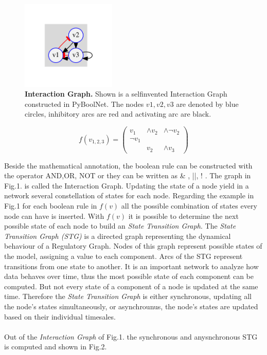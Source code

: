 \begin{figure}[H]
\centering
\includegraphics[width=0.4\textwidth]{./Bilder/example02_igraph}
\caption[Interaction Graph]{\textbf{Interaction Graph.} Shown is a selfinvented Interaction Graph constructed in PyBoolNet. The nodes $v1,v2,v3$ are denoted by blue circles, inhibitory arcs are red and activating arc are black. }
\label{fig:Fig.3.}
\end{figure}

\begin{equation}
f(v_{1,2,3})= \begin{pmatrix}
 v_1      & \wedge v_2 & \wedge \neg v_2\\
 \neg v_1 &           & \\
         & v_2        &\wedge v_3
\end{pmatrix}
\end{equation} 



Beside the mathematical annotation, the boolean rule can be constructed with the operator AND,OR, NOT or they can be written as \& , ||, ! . The graph in Fig.1. is called the Interaction Graph. Updating the state of a node yield in a network several constellation of states for each node. Regarding the example in Fig.1 for each boolean rule in $f(v)$ all the possible combination of states every node can have is inserted. With $f(v)$ it is possible to determine the next possible state of each node to build an \textit{State Transition Graph}. 
The \textit{State Transition Graph (STG)} is a directed graph representing the dynamical behaviour of a Regulatory Graph. Nodes of this graph represent possible states of the model, assigning a value to each component. Arcs of the STG represent transitions from one state to another. It is an important network to analyze how data behaves over time, thus the most possible state of each component can be computed. But not every state of a component of a node is updated at the same time. Therefore the \textit{State Transition Graph} is either synchronous, updating all the node's states simultaneously, or asynchrounus, the node's states are updated based on their individual timesales\citep{Lee799}. \\\\\newline
Out of the \textit{Interaction Graph} of Fig.1. the synchronous and anysnchronous STG is computed and shown in Fig.2.\\

